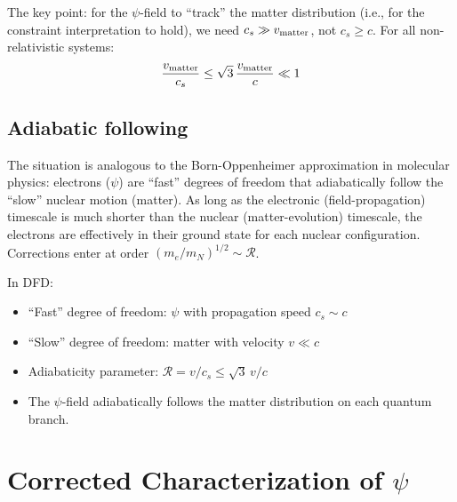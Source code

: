 \documentclass[12pt,a4paper]{article}
\begin{document}
The key point: for the $\psi$-field to ``track'' the matter distribution
(i.e., for the constraint interpretation to hold), we need $c_s \gg v_{\rm matter}$, not $c_s \geq c$. For all non-relativistic systems:
\begin{equation}
\frac{v_{\rm matter}}{c_s} \leq \sqrt{3}\,\frac{v_{\rm matter}}{c} \ll 1
\end{equation}

\subsection{Adiabatic following}

The situation is analogous to the Born-Oppenheimer approximation in molecular
physics: electrons ($\psi$) are ``fast'' degrees of freedom that adiabatically
follow the ``slow'' nuclear motion (matter). As long as the electronic
(field-propagation) timescale is much shorter than the nuclear (matter-evolution)
timescale, the electrons are effectively in their ground state for each nuclear
configuration. Corrections enter at order $(m_e/m_N)^{1/2} \sim \mathcal{R}$.

In DFD:
\begin{itemize}
\item ``Fast'' degree of freedom: $\psi$ with propagation speed $c_s \sim c$
\item ``Slow'' degree of freedom: matter with velocity $v \ll c$
\item Adiabaticity parameter: $\mathcal{R} = v/c_s \leq \sqrt{3}\,v/c$
\item The $\psi$-field adiabatically follows the matter distribution on
      each quantum branch.
\end{itemize}


\section{Corrected Characterization of $\psi$}
\label{sec:corrected}
\end{document}
